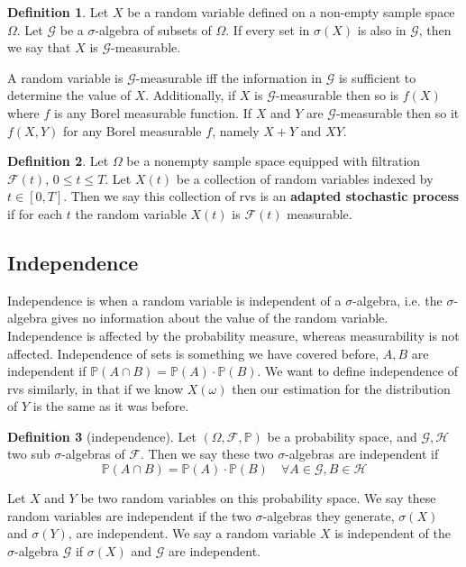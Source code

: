\documentclass[11pt]{article}
\theoremstyle{definition}
\theoremstyle{definition}
\theoremstyle{definition}
\newtheorem{definition}{\textcolor{OliveGreen}{Definition}}
\theoremstyle{remark}
\begin{document}
\begin{definition}
    Let $X$ be a random variable defined on a non-empty sample space $\Omega$. Let $\mathcal{G}$ be a 
    $\sigma$-algebra of subsets of $\Omega$. If every set in $\sigma(X)$ is also in $\mathcal{G}$, then 
    we say that $X$ is $\mathcal{G}$-measurable.
\end{definition}

A random variable is $\mathcal{G}$-measurable iff the information in $\mathcal{G}$ is sufficient to 
determine the value of $X$. Additionally, if $X$ is $\mathcal{G}$-measurable then so is $f(X)$ where
$f$ is any Borel measurable function. If $X$ and $Y$ are $\mathcal{G}$-measurable then so it $f(X, Y)$
for any Borel measurable $f$, namely $X + Y$ and $XY$. 

\begin{definition}
    Let $\Omega$ be a nonempty sample space equipped with filtration $\mathcal{F}(t)$, $0 \leq t \leq T$.
    Let $X(t)$ be a collection of random variables indexed by $t \in [0, T]$. Then we say this collection of 
    rvs is an \textbf{adapted stochastic process} if for each $t$ the random variable $X(t)$ is 
    $\mathcal{F}(t)$ measurable.        
\end{definition}

\subsection{Independence}
Independence is when a random variable is independent of a $\sigma$-algebra, i.e. the $\sigma$-algebra
gives no information about the value of the random variable. Independence is affected by the probability measure,
whereas measurability is not affected. Independence of sets is something we have covered before, 
$A, B$ are independent if $\mathbb{P}(A \cap B) = \mathbb{P}(A) \cdot \mathbb{P}(B)$. We want to define independence
of rvs similarly, in that if we know $X(\omega)$ then our estimation for the distribution of $Y$ is the same as it was before.

\begin{definition}[independence]
    Let $(\Omega, \mathcal{F}, \mathbb{P})$ be a probability space, and $\mathcal{G}, \mathcal{H}$ two sub $\sigma$-algebras
    of $\mathcal{F}$. Then we say these two $\sigma$-algebras are independent if
    \[
        \mathbb{P}(A \cap B) = \mathbb{P}(A) \cdot \mathbb{P}(B) \quad \forall A \in \mathcal{G}, B \in \mathcal{H}
    \]      

    Let $X$ and $Y$ be two random variables on this probability space. We say these random variables are independent if
    the two $\sigma$-algebras they generate, $\sigma(X)$ and $\sigma(Y)$, are independent. We say a random variable
    $X$ is independent of the $\sigma$-algebra $\mathcal{G}$ if $\sigma(X)$ and $\mathcal{G}$ are independent.          
\end{definition}
\end{document}
